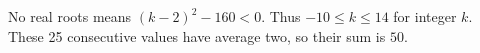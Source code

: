 No real roots means $(k-2)^2-160<0$. Thus $-10\le k\le14$ for integer $k$. These 25 consecutive values have average two, so their sum is $\boxed{50}$.
